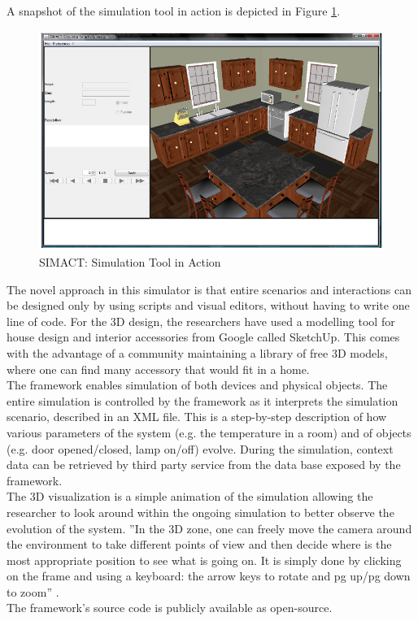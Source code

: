 A snapshot of the simulation tool in action is depicted in Figure \ref{fig:simact_simulation_tool}.

\begin{figure}[H]
	\centering
	\includegraphics[width=\linewidth]{gfx/Chapter2/simact_simulation_tool}
	\caption{SIMACT: Simulation Tool in Action}
	\label{fig:simact_simulation_tool}
\end{figure}

The novel approach in this simulator is that entire scenarios and interactions can be designed only by using scripts and visual editors, without having to write one line of code. For the 3D design, the researchers have used a modelling tool for house design and interior accessories from Google called SketchUp. This comes with the advantage of a community maintaining a library of free 3D models, where one can find many accessory that would fit in a home.\\

The framework enables simulation of both devices and physical objects. The entire simulation is controlled by the framework as it interprets the simulation scenario, described in an XML file. This is a step-by-step description of how various parameters of the system (e.g. the temperature in a room) and of objects (e.g. door opened/closed, lamp on/off) evolve. During the simulation, context data can be retrieved by third party service from the data base exposed by the framework.\\

The 3D visualization is a simple animation of the simulation allowing the researcher to look around within the ongoing simulation to better observe the evolution of the system. ''In the 3D zone, one can freely move the camera around the environment to take different points of view and then decide where is the most appropriate position to see what is going on. It is simply done by clicking on the frame and using a keyboard: the arrow keys to rotate and pg up/pg down to zoom'' \cite{bouchard2012simact}.\\

The framework's source code is publicly available as open-source.
